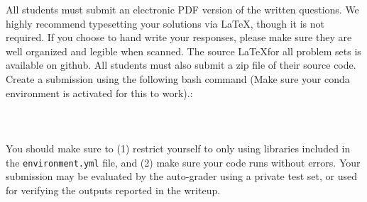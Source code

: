 All students must submit an electronic PDF version of the written questions.  We highly recommend typesetting your solutions via \LaTeX, though it is not required. If you choose to hand write your responses, please make sure they are well organized and legible when scanned. The source \LaTeX for all problem sets is available on github.
All students must also submit a zip file of their source code.
Create a submission using the following bash command (Make sure your conda environment is activated for this to work).:\\\\
\small{\zipscript}\\\\
You should make sure to (1) restrict yourself to only using libraries included in the \texttt{environment.yml} file, and (2) make sure your code runs without errors.
Your submission may be evaluated by the auto-grader using a private test set, or used for verifying the outputs reported in the writeup.